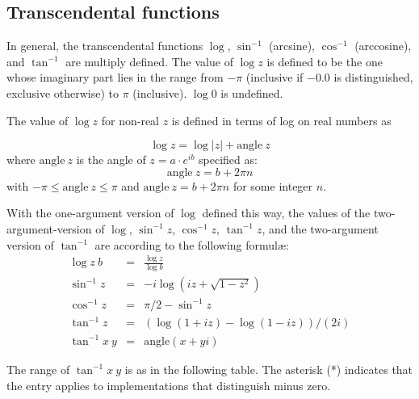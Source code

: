 \subsection{Transcendental functions}
\label{transcendentalfunctions}

In general, the transcendental functions $\log$, $\sin^{-1}$
(arcsine), $\cos^{-1}$ (arccosine), and $\tan^{-1}$ are multiply
defined.  The value of $\log z$ is defined to be the one whose
imaginary part lies in the range from $-\pi$ (inclusive if $-0.0$ is
distinguished, exclusive otherwise) to $\pi$ (inclusive).  $\log 0$ is
undefined.

The value of $\log z$ for non-real $z$ is defined in terms of log on real numbers as 

\begin{displaymath}
\log z = \log |z| + \mathrm{angle}~z
\end{displaymath}
%
where $\mathrm{angle}~z$ is the angle of $z = a\cdot e^{ib}$ specified
as:
$$\mathrm{angle}~z = b+2\pi n$$
with $-\pi \leq \mathrm{angle}~z\leq \pi$ and $\mathrm{angle}~z =
b+2\pi n$ for some integer $n$.

With the one-argument version of $\log$ defined this way, the values
of the two-argument-version of $\log$, $\sin^{-1} z$, $\cos^{-1} z$,
$\tan^{-1} z$, and the two-argument version of $\tan^{-1}$ are
according to the following formul\ae:
\begin{eqnarray*}
\log z~b &=& \frac{\log z}{\log b}\\
\sin^{-1} z &=& -i \log (i z + \sqrt{1 - z^2})\\
\cos^{-1} z &=& \pi / 2 - \sin^{-1} z\\
\tan^{-1} z &=& (\log (1 + i z) - \log (1 - i z)) / (2 i)\\
\tan^{-1} x~y &=& \mathrm{angle}(x+ yi)
\end{eqnarray*}

The range of $\tan^{-1} x~y$ is as in the following table. The
asterisk (*) indicates that the entry applies to implementations that
distinguish minus zero.

